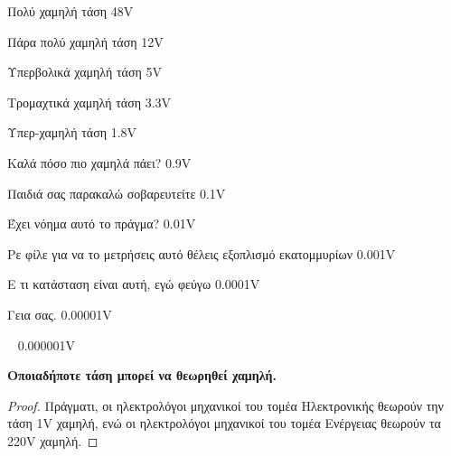 \documentclass[11pt,a4paper,notitlepage,fleqn]{article}
\begin{document}
\begin{defn}{Πολύ χαμηλή τάση}{}
	48V
\end{defn}

\begin{defn}{Πάρα πολύ χαμηλή τάση}{}
	12V
\end{defn}

\begin{defn}{Υπερβολικά χαμηλή τάση}{}
	5V
\end{defn}

\begin{defn}{Τρομαχτικά χαμηλή τάση}{}
	3.3V
\end{defn}

\begin{defn}{Υπερ-χαμηλή τάση}{}
	1.8V
\end{defn}

\begin{defn}{Καλά πόσο πιο χαμηλά πάει?}{}
	0.9V
\end{defn}

\begin{defn}{Παιδιά σας παρακαλώ σοβαρευτείτε}{}
	0.1V
\end{defn}

\begin{defn}{Έχει νόημα αυτό το πράγμα?}{}
	0.01V
\end{defn}

\begin{defn}{Ρε φίλε για να το μετρήσεις αυτό θέλεις εξοπλισμό εκατομμυρίων}{}
	0.001V
\end{defn}

\begin{defn}{Ε τι κατάσταση είναι αυτή, εγώ φεύγω}{}
	0.0001V
\end{defn}

\begin{defn}{Γεια σας.}{}
	0.00001V
\end{defn}

\begin{defn}{~}{}
	0.000001V
\end{defn}

\begin{theorem}[label=thm:1]{}{}
	\textbf{Οποιαδήποτε τάση μπορεί να θεωρηθεί χαμηλή.}
\end{theorem}
\begin{proof}
	Πράγματι, οι ηλεκτρολόγοι μηχανικοί του τομέα Ηλεκτρονικής θεωρούν την τάση 1V χαμηλή, ενώ οι ηλεκτρολόγοι μηχανικοί του τομέα Ενέργειας θεωρούν τα 220V χαμηλή.
\end{proof}
\end{document}
